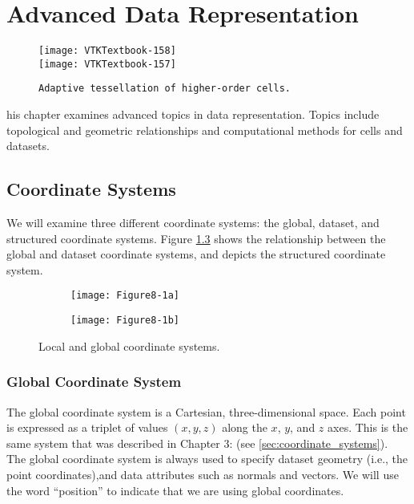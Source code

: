 \chapter{Advanced Data Representation}
\label{chap:advanced_data_representation}

\begin{figure}[ht]
	\hfill
	\begin{minipage}{0.5\textwidth}
		\centering
		\texttt{[image: VTKTextbook-158]}\\
		\texttt{[image: VTKTextbook-157]}
		\caption*{\texttt{Adaptive tessellation of higher-order cells.}}
	\end{minipage}
\end{figure}


his chapter examines advanced topics in data representation.
Topics include topological and geometric relationships and computational methods for cells and datasets.

\section{Coordinate Systems}
We will examine three different coordinate systems: the global, dataset, and structured coordinate systems.
Figure \ref{fig:Figure8-1} shows the relationship between the global and dataset coordinate systems, and depicts the structured coordinate system.

\begin{figure}[!htb]
	\centering
	\begin{subfigure}{0.48\linewidth}
		\centering
		\texttt{[image: Figure8-1a]}
		\caption*{}\label{fig:Figure8-1a}
	\end{subfigure}
	\hfill
	\begin{subfigure}{0.48\linewidth}
		\centering
		\texttt{[image: Figure8-1b]}
		\caption*{}\label{fig:Figure8-1b}
	\end{subfigure}%
	\caption{Local and global coordinate systems.}
	\label{fig:Figure8-1}
\end{figure}


\subsection{Global Coordinate System}
The global coordinate system is a Cartesian, three-dimensional space. Each point is expressed as a triplet of values $(x,y,z)$ along the $x$, $y$, and $z$ axes.
This is the same system that was described in Chapter 3:  (see \ref{sec:coordinate_systems}).
The global coordinate system is always used to specify dataset geometry (i.e., the point coordinates),and data attributes such as normals and vectors.
We will use the word ``position'' to indicate that we are using global coordinates.

